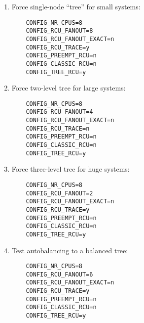 \begin{enumerate}
\item	Force single-node ``tree'' for small systems:

\vspace{5pt}
\begin{minipage}[t]{\columnwidth}
\scriptsize
\begin{verbatim}
	CONFIG_NR_CPUS=8
	CONFIG_RCU_FANOUT=8
	CONFIG_RCU_FANOUT_EXACT=n
	CONFIG_RCU_TRACE=y
	CONFIG_PREEMPT_RCU=n
	CONFIG_CLASSIC_RCU=n
	CONFIG_TREE_RCU=y
\end{verbatim}
\end{minipage}
\vspace{5pt}

\item	Force two-level tree for large systems:

\vspace{5pt}
\begin{minipage}[t]{\columnwidth}
\scriptsize
\begin{verbatim}
	CONFIG_NR_CPUS=8
	CONFIG_RCU_FANOUT=4
	CONFIG_RCU_FANOUT_EXACT=n
	CONFIG_RCU_TRACE=n
	CONFIG_PREEMPT_RCU=n
	CONFIG_CLASSIC_RCU=n
	CONFIG_TREE_RCU=y
\end{verbatim}
\end{minipage}
\vspace{5pt}

\item	Force three-level tree for huge systems:

\vspace{5pt}
\begin{minipage}[t]{\columnwidth}
\scriptsize
\begin{verbatim}
	CONFIG_NR_CPUS=8
	CONFIG_RCU_FANOUT=2
	CONFIG_RCU_FANOUT_EXACT=n
	CONFIG_RCU_TRACE=y
	CONFIG_PREEMPT_RCU=n
	CONFIG_CLASSIC_RCU=n
	CONFIG_TREE_RCU=y
\end{verbatim}
\end{minipage}
\vspace{5pt}

\item	Test autobalancing to a balanced tree:

\vspace{5pt}
\begin{minipage}[t]{\columnwidth}
\scriptsize
\begin{verbatim}
	CONFIG_NR_CPUS=8
	CONFIG_RCU_FANOUT=6
	CONFIG_RCU_FANOUT_EXACT=n
	CONFIG_RCU_TRACE=y
	CONFIG_PREEMPT_RCU=n
	CONFIG_CLASSIC_RCU=n
	CONFIG_TREE_RCU=y
\end{verbatim}
\end{minipage}
\vspace{5pt}


\end{enumerate}
